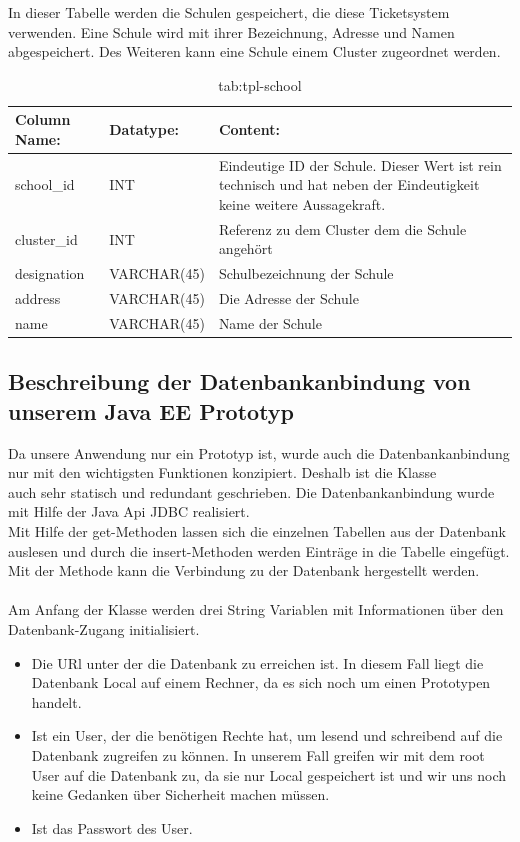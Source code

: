 In dieser Tabelle werden die Schulen gespeichert, die diese Ticketsystem verwenden.
Eine Schule wird mit ihrer Bezeichnung, Adresse und Namen abgespeichert. Des Weiteren kann eine Schule einem Cluster zugeordnet werden. 

\begin{table}[h]
	\begin{tabular}{|p{3.5cm}|p{4cm}|p{6.2cm}|}
		\hline
		\textbf{Column Name:} & \textbf{Datatype:} & \textbf{Content:}\\
		\hline
		school\_id & INT & Eindeutige ID der Schule. Dieser Wert ist rein technisch und hat neben der Eindeutigkeit keine weitere Aussagekraft.\\
		\hline
		cluster\_id & INT & Referenz zu dem Cluster dem die Schule angehört\\
		\hline
		designation & VARCHAR(45) & Schulbezeichnung der Schule\\
		\hline
		address & VARCHAR(45) & Die Adresse der Schule\\
		\hline
		name & VARCHAR(45) & Name der Schule\\
		\hline
	\end{tabular}
	\caption{tab:tpl-school}
\end{table}
\label{tab:tpl_school}

\newpage


\subsection{Beschreibung der Datenbankanbindung von unserem Java EE Prototyp}

Da unsere Anwendung nur ein Prototyp ist, wurde auch die Datenbankanbindung nur mit den wichtigsten Funktionen konzipiert. Deshalb ist die Klasse\\
 auch sehr statisch und redundant geschrieben. 
Die Datenbankanbindung wurde mit Hilfe der Java Api JDBC realisiert.\\
Mit Hilfe der get-Methoden lassen sich die einzelnen Tabellen aus der Datenbank auslesen und durch die insert-Methoden werden Einträge in die Tabelle eingefügt.
Mit der Methode  kann die Verbindung zu der Datenbank hergestellt werden.\\
\\
Am Anfang der Klasse werden drei String Variablen mit Informationen über den Datenbank-Zugang initialisiert.
\begin{itemize}
	\item {} Die URl unter der die Datenbank zu erreichen ist. In diesem Fall liegt die Datenbank Local auf einem Rechner, da es sich noch um einen Prototypen handelt.
	\item {} Ist ein User, der die benötigen Rechte hat, um lesend und schreibend auf die Datenbank zugreifen zu können. In unserem Fall greifen wir mit dem root User auf die Datenbank zu, da sie nur Local gespeichert ist und wir uns noch keine Gedanken über Sicherheit machen müssen.
	\item {} Ist das Passwort des User. 
\end{itemize}

